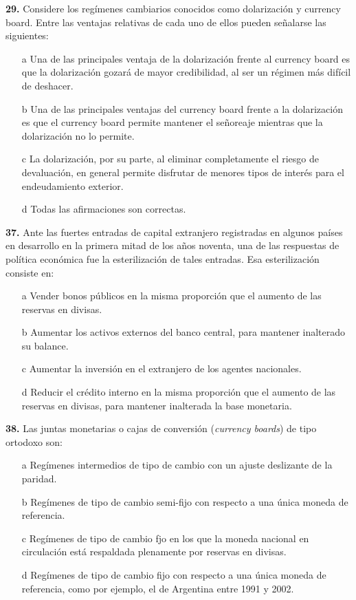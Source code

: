 \documentclass{nuevotema}
\begin{document}
\textbf{29.} Considere los regímenes cambiarios conocidos como dolarización y currency board. Entre las ventajas relativas de cada uno de ellos pueden señalarse las siguientes:

\begin{itemize}
	\item[a] Una de las principales ventaja de la dolarización frente al currency board es que la dolarización gozará de mayor credibilidad, al ser un régimen más difícil de deshacer.
	\item[b] Una de las principales ventajas del currency board frente a la dolarización es que el currency board permite mantener el señoreaje mientras que la dolarización no lo permite.
	\item[c] La dolarización, por su parte, al eliminar completamente el riesgo de devaluación, en general permite disfrutar de menores tipos de interés para el endeudamiento exterior.
	\item[d] Todas las afirmaciones son correctas.
\end{itemize}


\textbf{37.} Ante las fuertes entradas de capital extranjero registradas en algunos países en desarrollo en la primera mitad de los años noventa, una de las respuestas de política económica fue la esterilización de tales entradas. Esa esterilización consiste en:
\begin{itemize}
	\item[a] Vender bonos públicos en la misma proporción que el aumento de las reservas en divisas.
	\item[b] Aumentar los activos externos del banco central, para mantener inalterado su balance.
	\item[c] Aumentar la inversión en el extranjero de los agentes nacionales.
	\item[d] Reducir el crédito interno en la misma proporción que el aumento de las reservas en divisas, para mantener inalterada la base monetaria.
\end{itemize}

\textbf{38.} Las juntas monetarias o cajas de conversión (\textit{currency boards}) de tipo ortodoxo son:
\begin{itemize}
	\item[a] Regímenes intermedios de tipo de cambio con un ajuste deslizante de la paridad.
	\item[b] Regímenes de tipo de cambio semi-fijo con respecto a una única moneda de referencia.
	\item[c] Regímenes de tipo de cambio fjo en los que la moneda nacional en circulación está respaldada plenamente por reservas en divisas.
	\item[d] Regímenes de tipo de cambio fijo con respecto a una única moneda de referencia, como por ejemplo, el de Argentina entre 1991 y 2002.
\end{itemize}
\end{document}
